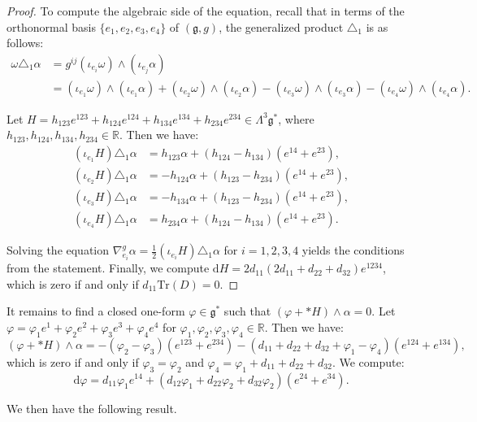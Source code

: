 \documentclass[10pt,reqno]{amsart}
\theoremstyle{definition}
\theoremstyle{remark}
\newcommand{\R}{\mathbb{R}}
\newcommand{\Tr}{\mathrm{Tr}}
\renewcommand{\d}{\mathrm{d}}
\begin{document}
\begin{proof}
    To compute the algebraic side of the equation, recall that in terms of the orthonormal basis $\{e_1,e_2,e_3,e_4\}$ of $(\mathfrak{g},g)$, the generalized product $\triangle_1$ is as follows: \begin{align*}
        \omega\triangle_1\alpha&=g^{ij}(\iota_{e_i}\omega)\wedge(\iota_{e_j}\alpha)\\
        &=(\iota_{e_1}\omega)\wedge(\iota_{e_1}\alpha)+(\iota_{e_2}\omega)\wedge(\iota_{e_2}\alpha)-(\iota_{e_3}\omega)\wedge(\iota_{e_3}\alpha)-(\iota_{e_4}\omega)\wedge(\iota_{e_4}\alpha).
    \end{align*}
    
    Let $H=h_{123}e^{123}+h_{124}e^{124}+h_{134}e^{134}+h_{234}e^{234}\in\Lambda^3\mathfrak{g}^*$, where $h_{123},h_{124},h_{134},h_{234}\in\R$. Then we have: \begin{align*}
        (\iota_{e_1}H)\triangle_1\alpha&=h_{123}\alpha+(h_{124}-h_{134})(e^{14}+e^{23}),\\
        (\iota_{e_2}H)\triangle_1\alpha&=-h_{124}\alpha+(h_{123}-h_{234})(e^{14}+e^{23}),\\
        (\iota_{e_3}H)\triangle_1\alpha&=-h_{134}\alpha+(h_{123}-h_{234})(e^{14}+e^{23}),\\
        (\iota_{e_4}H)\triangle_1\alpha&=h_{234}\alpha+(h_{124}-h_{134})(e^{14}+e^{23}).
    \end{align*}

    Solving the equation $\nabla^g_{e_i}\alpha=\tfrac{1}{2}(\iota_{e_i}H)\triangle_1\alpha$ for $i=1,2,3,4$ yields the conditions from the statement. Finally, we compute $\d H=2d_{11}(2d_{11}+d_{22}+d_{32})e^{1234}$, which is zero if and only if $d_{11}\Tr(D)=0$.
\end{proof}

It remains to find a closed one-form $\varphi\in\mathfrak{g}^*$ such that $(\varphi+*H)\wedge\alpha=0$. Let $\varphi=\varphi_1e^1+\varphi_2e^2+\varphi_3e^3+\varphi_4e^4$ for $\varphi_1,\varphi_2,\varphi_3,\varphi_4\in\R$. Then we have: $$(\varphi+*H)\wedge\alpha=-(\varphi_2-\varphi_3)(e^{123}+e^{234})-(d_{11}+d_{22}+d_{32}+\varphi_1-\varphi_4)(e^{124}+e^{134}),$$ which is zero if and only if $\varphi_3=\varphi_2$ and $\varphi_4=\varphi_1+d_{11}+d_{22}+d_{32}$. We compute: $$\d\varphi=d_{11}\varphi_1e^{14}+(d_{12}\varphi_1+d_{22}\varphi_2+d_{32}\varphi_2)(e^{24}+e^{34}).$$

We then have the following result.
\end{document}
